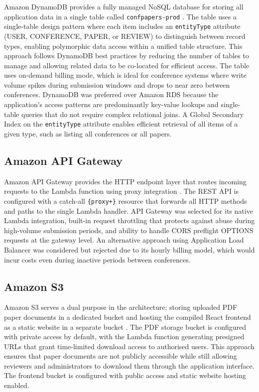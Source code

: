 \documentclass[conference]{IEEEtran}
\begin{document}
Amazon DynamoDB provides a fully managed NoSQL database for storing all application data in a single table called \texttt{confpapers-prod} \cite{awsdynamodb}. The table uses a single-table design pattern where each item includes an \texttt{entityType} attribute (USER, CONFERENCE, PAPER, or REVIEW) to distinguish between record types, enabling polymorphic data access within a unified table structure. This approach follows DynamoDB best practices by reducing the number of tables to manage and allowing related data to be co-located for efficient access. The table uses on-demand billing mode, which is ideal for conference systems where write volume spikes during submission windows and drops to near zero between conferences. DynamoDB was preferred over Amazon RDS because the application's access patterns are predominantly key-value lookups and single-table queries that do not require complex relational joins. A Global Secondary Index on the \texttt{entityType} attribute enables efficient retrieval of all items of a given type, such as listing all conferences or all papers.

\subsection{Amazon API Gateway}

Amazon API Gateway provides the HTTP endpoint layer that routes incoming requests to the Lambda function using proxy integration \cite{awsapigateway}. The REST API is configured with a catch-all \texttt{\{proxy+\}} resource that forwards all HTTP methods and paths to the single Lambda handler. API Gateway was selected for its native Lambda integration, built-in request throttling that protects against abuse during high-volume submission periods, and ability to handle CORS preflight OPTIONS requests at the gateway level. An alternative approach using Application Load Balancer was considered but rejected due to its hourly billing model, which would incur costs even during inactive periods between conferences.

\subsection{Amazon S3}

Amazon S3 serves a dual purpose in the architecture: storing uploaded PDF paper documents in a dedicated bucket and hosting the compiled React frontend as a static website in a separate bucket \cite{awss3}. The PDF storage bucket is configured with private access by default, with the Lambda function generating presigned URLs that grant time-limited download access to authorised users. This approach ensures that paper documents are not publicly accessible while still allowing reviewers and administrators to download them through the application interface. The frontend bucket is configured with public access and static website hosting enabled.
\end{document}
